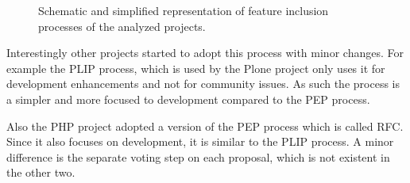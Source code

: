 \begin{figure}[ph]
  \centering
  \noindent{}

  \vspace{0.5cm}

  \noindent{}

  \vspace{0.5cm}

  \noindent{}

  \vspace{0.5cm}

  \noindent{}

  \vspace{0.5cm}

  \noindent{}

  \vspace{0.5cm}

  \caption[Representation of Feature Inclusion Processes]
  {Schematic and simplified representation of feature inclusion processes of
    the analyzed projects.}
\end{figure}

Interestingly other projects started to adopt this process with minor changes.
For example the \ac{PLIP} process, which is used by the Plone project only uses
it for development enhancements and not for community issues. As such the
process is a simpler and more focused to development compared to the \ac{PEP}
process.

Also the PHP project adopted a version of the \ac{PEP} process which is called
\ac{RFC}. Since it also focuses on development, it is similar to the \ac{PLIP}
process. A minor difference is the separate voting step on each proposal, which
is not existent in the other two.

